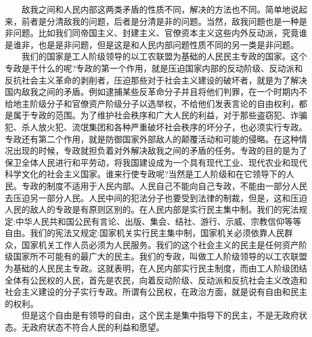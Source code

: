 \documentclass[cn,11pt,chinese]{elegantbook}
\begin{document}
　　敌我之间和人民内部这两类矛盾的性质不同，解决的方法也不同。简单地说起来，前者是分清敌我的问题，后者是分清是非的问题。当然，敌我问题也是一种是非问题。比如我们同帝国主义、封建主义、官僚资本主义这些内外反动派，究竟谁是谁非，也是是非问题，但是这是和人民内部问题性质不同的另一类是非问题。\\
　　我们的国家是工人阶级领导的以工农联盟为基础的人民民主专政的国家。这个专政是干什么的呢?专政的第一个作用，就是压迫国家内部的反动阶级、反动派和反抗社会主义革命的剥削者，压迫那些对于社会主义建设的破坏者，就是为了解决国内敌我之间的矛盾。例如逮捕某些反革命分子并且将他们判罪，在一个时期内不给地主阶级分子和官僚资产阶级分子以选举权，不给他们发表言论的自由权利，都是属于专政的范围。为了维护社会秩序和广大人民的利益，对于那些盗窃犯、诈骗犯、杀人放火犯、流氓集团和各种严重破坏社会秩序的坏分子，也必须实行专政。专政还有第二个作用，就是防御国家外部敌人的颠覆活动和可能的侵略。在这种情况出现的时候，专政就担负着对外解决敌我之间的矛盾的任务。专政的目的是为了保卫全体人民进行和平劳动，将我国建设成为一个具有现代工业、现代农业和现代科学文化的社会主义国家。谁来行使专政呢?当然是工人阶级和在它领导下的人民。专政的制度不适用于人民内部。人民自己不能向自己专政，不能由一部分人民去压迫另一部分人民。人民中间的犯法分子也要受到法律的制裁，但是，这和压迫人民的敌人的专政是有原则区别的。在人民内部是实行民主集中制。我们的宪法规定:中华人民共和国公民有言论、出版、集会、结社、游行、示威、宗教信仰等等自由。我们的宪法又规定:国家机关实行民主集中制，国家机关必须依靠人民群众，国家机关工作人员必须为人民服务。我们的这个社会主义的民主是任何资产阶级国家所不可能有的最广大的民主。我们的专政，叫做工人阶级领导的以工农联盟为基础的人民民主专政。这就表明，在人民内部实行民主制度，而由工人阶级团结全体有公民权的人民，首先是农民，向着反动阶级、反动派和反抗社会主义改造和社会主义建设的分子实行专政。所谓有公民权，在政治方面，就是说有自由和民主的权利。\\
　　但是这个自由是有领导的自由，这个民主是集中指导下的民主，不是无政府状态。无政府状态不符合人民的利益和愿望。\\
\end{document}
